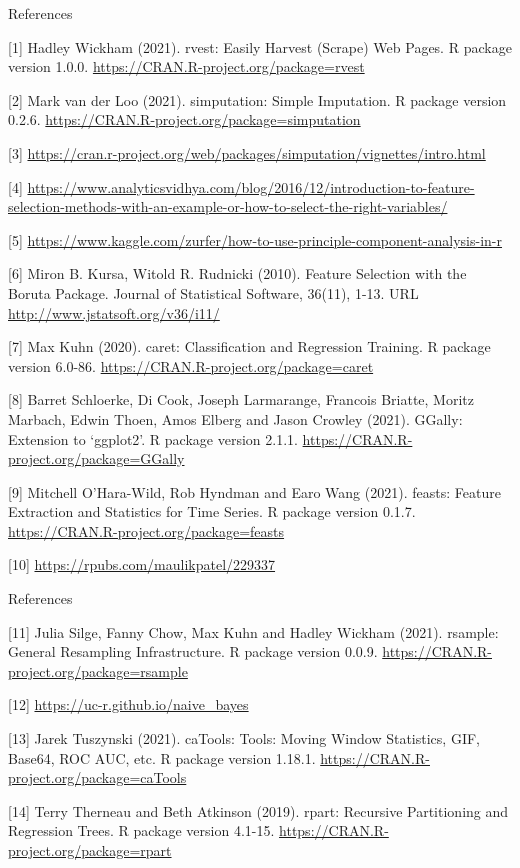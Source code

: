 \documentclass[12pt,ignorenonframetext,]{beamer}
\begin{document}
\begin{frame}{References}
\protect\hypertarget{references}{}

\tiny

{[}1{]} Hadley Wickham (2021). rvest: Easily Harvest (Scrape) Web Pages.
R package version 1.0.0. \url{https://CRAN.R-project.org/package=rvest}

{[}2{]} Mark van der Loo (2021). simputation: Simple Imputation. R
package version 0.2.6.
\url{https://CRAN.R-project.org/package=simputation}

{[}3{]}
\url{https://cran.r-project.org/web/packages/simputation/vignettes/intro.html}

{[}4{]}
\url{https://www.analyticsvidhya.com/blog/2016/12/introduction-to-feature-selection-methods-with-an-example-or-how-to-select-the-right-variables/}

{[}5{]}
\url{https://www.kaggle.com/zurfer/how-to-use-principle-component-analysis-in-r}

{[}6{]} Miron B. Kursa, Witold R. Rudnicki (2010). Feature Selection
with the Boruta Package. Journal of Statistical Software, 36(11), 1-13.
URL \url{http://www.jstatsoft.org/v36/i11/}

{[}7{]} Max Kuhn (2020). caret: Classification and Regression Training.
R package version 6.0-86. \url{https://CRAN.R-project.org/package=caret}

{[}8{]} Barret Schloerke, Di Cook, Joseph Larmarange, Francois Briatte,
Moritz Marbach, Edwin Thoen, Amos Elberg and Jason Crowley (2021).
GGally: Extension to `ggplot2'. R package version 2.1.1.
\url{https://CRAN.R-project.org/package=GGally}

{[}9{]} Mitchell O'Hara-Wild, Rob Hyndman and Earo Wang (2021). feasts:
Feature Extraction and Statistics for Time Series. R package version
0.1.7. \url{https://CRAN.R-project.org/package=feasts}

{[}10{]} \url{https://rpubs.com/maulikpatel/229337}

\end{frame}

\begin{frame}{References}
\protect\hypertarget{references-1}{}

\tiny

{[}11{]} Julia Silge, Fanny Chow, Max Kuhn and Hadley Wickham (2021).
rsample: General Resampling Infrastructure. R package version 0.0.9.
\url{https://CRAN.R-project.org/package=rsample}

{[}12{]} \url{https://uc-r.github.io/naive_bayes}

{[}13{]} Jarek Tuszynski (2021). caTools: Tools: Moving Window
Statistics, GIF, Base64, ROC AUC, etc. R package version 1.18.1.
\url{https://CRAN.R-project.org/package=caTools}

{[}14{]} Terry Therneau and Beth Atkinson (2019). rpart: Recursive
Partitioning and Regression Trees. R package version 4.1-15.
\url{https://CRAN.R-project.org/package=rpart}

\end{frame}

  
\end{document}
